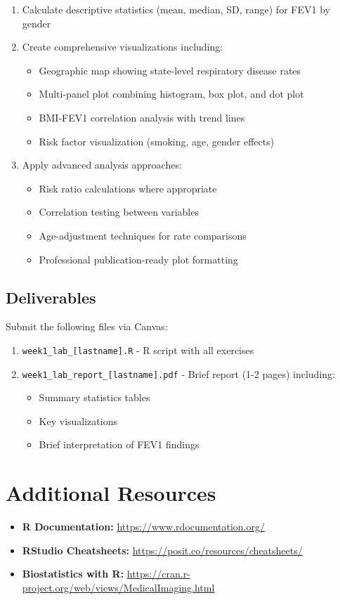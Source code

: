 \documentclass[11pt]{article}
\begin{document}
\begin{enumerate}
\item Calculate descriptive statistics (mean, median, SD, range) for FEV1 by gender
\item Create comprehensive visualizations including:
   \begin{itemize}
   \item Geographic map showing state-level respiratory disease rates
   \item Multi-panel plot combining histogram, box plot, and dot plot
   \item BMI-FEV1 correlation analysis with trend lines
   \item Risk factor visualization (smoking, age, gender effects)
   \end{itemize}
\item Apply advanced analysis approaches:
   \begin{itemize}
   \item Risk ratio calculations where appropriate
   \item Correlation testing between variables
   \item Age-adjustment techniques for rate comparisons
   \item Professional publication-ready plot formatting
   \end{itemize}
\end{enumerate}

\subsection{Deliverables}

Submit the following files via Canvas:

\begin{enumerate}
\item \texttt{week1\_lab\_[lastname].R} - R script with all exercises
\item \texttt{week1\_lab\_report\_[lastname].pdf} - Brief report (1-2 pages) including:
   \begin{itemize}
   \item Summary statistics tables
   \item Key visualizations
   \item Brief interpretation of FEV1 findings
   \end{itemize}
\end{enumerate}

\section{Additional Resources}

\begin{itemize}
\item \textbf{R Documentation:} \url{https://www.rdocumentation.org/}
\item \textbf{RStudio Cheatsheets:} \url{https://posit.co/resources/cheatsheets/}
\item \textbf{Biostatistics with R:} \url{https://cran.r-project.org/web/views/MedicalImaging.html}
\end{itemize}
\end{document}
